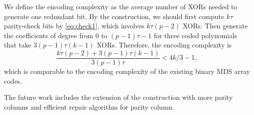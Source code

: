 \documentclass[conference]{IEEEtran}
\begin{document}
We define the encoding complexity as the average number of XORs needed to generate one redundant bit. By the construction, we should first compute $k\tau$ parity-check bits by \eqref{eq:check1}, which involves $k\tau(p-2)$ XORs. Then generate the coefficients of degree from 0 to $(p-1)\tau-1$ for three coded polynomials that take $3(p-1)\tau(k-1)$ XORs. Therefore, the encoding complexity is
\[
\frac{k\tau(p-2)+3(p-1)\tau(k-1)}{3(p-1)\tau}<4k/3-1,
\]
which is comparable to the encoding complexity of the existing binary MDS array codes.


The future work includes the extension of the construction with more parity columns and efficient repair algorithm for parity column.



\appendices




\end{document}
